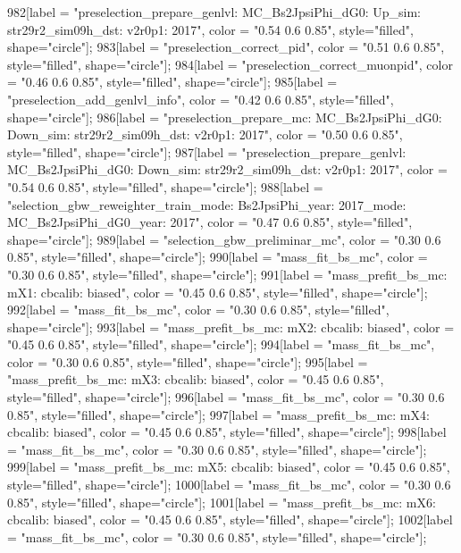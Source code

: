 {	982[label = "preselection_prepare_genlvl\nmode: MC_Bs2JpsiPhi_dG0\npolarity: Up\nstrip_sim: str29r2_sim09h_dst\nversion: v2r0p1\nyear: 2017", color = "0.54 0.6 0.85", style="filled", shape="circle"];
	983[label = "preselection_correct_pid", color = "0.51 0.6 0.85", style="filled", shape="circle"];
	984[label = "preselection_correct_muonpid", color = "0.46 0.6 0.85", style="filled", shape="circle"];
	985[label = "preselection_add_genlvl_info", color = "0.42 0.6 0.85", style="filled", shape="circle"];
	986[label = "preselection_prepare_mc\nmode: MC_Bs2JpsiPhi_dG0\npolarity: Down\nstrip_sim: str29r2_sim09h_dst\nversion: v2r0p1\nyear: 2017", color = "0.50 0.6 0.85", style="filled", shape="circle"];
	987[label = "preselection_prepare_genlvl\nmode: MC_Bs2JpsiPhi_dG0\npolarity: Down\nstrip_sim: str29r2_sim09h_dst\nversion: v2r0p1\nyear: 2017", color = "0.54 0.6 0.85", style="filled", shape="circle"];
	988[label = "selection_gbw_reweighter_train\ndata_mode: Bs2JpsiPhi\ndata_year: 2017\nmc_mode: MC_Bs2JpsiPhi_dG0\nmc_year: 2017", color = "0.47 0.6 0.85", style="filled", shape="circle"];
	989[label = "selection_gbw_preliminar_mc", color = "0.30 0.6 0.85", style="filled", shape="circle"];
	990[label = "mass_fit_bs_mc", color = "0.30 0.6 0.85", style="filled", shape="circle"];
	991[label = "mass_prefit_bs_mc\nmassbin: mX1\nmassmodel: cbcalib\ntrigger: biased", color = "0.45 0.6 0.85", style="filled", shape="circle"];
	992[label = "mass_fit_bs_mc", color = "0.30 0.6 0.85", style="filled", shape="circle"];
	993[label = "mass_prefit_bs_mc\nmassbin: mX2\nmassmodel: cbcalib\ntrigger: biased", color = "0.45 0.6 0.85", style="filled", shape="circle"];
	994[label = "mass_fit_bs_mc", color = "0.30 0.6 0.85", style="filled", shape="circle"];
	995[label = "mass_prefit_bs_mc\nmassbin: mX3\nmassmodel: cbcalib\ntrigger: biased", color = "0.45 0.6 0.85", style="filled", shape="circle"];
	996[label = "mass_fit_bs_mc", color = "0.30 0.6 0.85", style="filled", shape="circle"];
	997[label = "mass_prefit_bs_mc\nmassbin: mX4\nmassmodel: cbcalib\ntrigger: biased", color = "0.45 0.6 0.85", style="filled", shape="circle"];
	998[label = "mass_fit_bs_mc", color = "0.30 0.6 0.85", style="filled", shape="circle"];
	999[label = "mass_prefit_bs_mc\nmassbin: mX5\nmassmodel: cbcalib\ntrigger: biased", color = "0.45 0.6 0.85", style="filled", shape="circle"];
	1000[label = "mass_fit_bs_mc", color = "0.30 0.6 0.85", style="filled", shape="circle"];
	1001[label = "mass_prefit_bs_mc\nmassbin: mX6\nmassmodel: cbcalib\ntrigger: biased", color = "0.45 0.6 0.85", style="filled", shape="circle"];
	1002[label = "mass_fit_bs_mc", color = "0.30 0.6 0.85", style="filled", shape="circle"];
}
